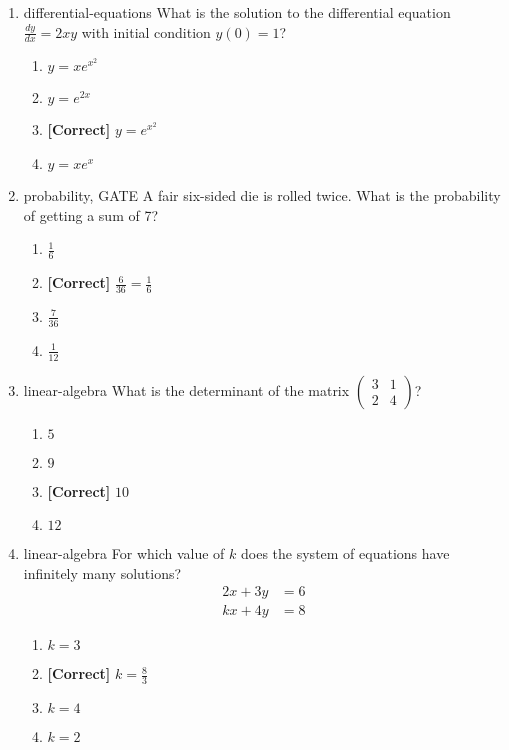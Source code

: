\documentclass{article}
\newenvironment{problem}{\item}{}
\newcommand{\choice}{\item}
\newcommand{\correctchoice}{\item \textbf{[Correct] }}
\newcommand{\tags}[1]{#1} %
\begin{document}
\begin{enumerate}
        \begin{problem}
            \tags{differential-equations}
            What is the solution to the differential equation $\frac{dy}{dx} = 2xy$ with initial condition $y(0) = 1$?
            \begin{enumerate}
                \choice $y = xe^{x^2}$
                \choice $y = e^{2x}$
                \correctchoice $y = e^{x^2}$
                \choice $y = xe^x$
            \end{enumerate}
        \end{problem}

        \begin{problem}
            \tags{probability, GATE}
            A fair six-sided die is rolled twice. What is the probability of getting a sum of 7?
            \begin{enumerate}
                \choice $\frac{1}{6}$
                \correctchoice $\frac{6}{36} = \frac{1}{6}$
                \choice $\frac{7}{36}$
                \choice $\frac{1}{12}$
            \end{enumerate}
        \end{problem}

        \begin{problem}
            \tags{linear-algebra}
            What is the determinant of the matrix $\begin{pmatrix} 3 & 1 \\ 2 & 4 \end{pmatrix}$?
            \begin{enumerate}
                \choice $5$
                \choice $9$
                \correctchoice $10$
                \choice $12$
            \end{enumerate}
        \end{problem}

        \begin{problem}
            \tags{linear-algebra}
            For which value of $k$ does the system of equations have infinitely many solutions?
            \begin{align}
                2x + 3y &= 6 \\
                kx + 4y &= 8
            \end{align}
            \begin{enumerate}
                \choice $k = 3$
                \correctchoice $k = \frac{8}{3}$
                \choice $k = 4$
                \choice $k = 2$
            \end{enumerate}
        \end{problem}


\end{enumerate}
\end{document}

